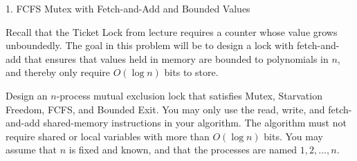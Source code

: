 \documentclass[12pt]{article}
\begin{document}


\begin{problem}{1. FCFS Mutex with Fetch-and-Add and Bounded Values}
        
    Recall that the Ticket Lock from lecture requires a counter whose value grows unboundedly. The goal in this problem will be to design a lock with fetch-and-add that ensures that values held in memory are bounded to polynomials in $n$, and thereby only require $O(\log n)$ bits to store.

    Design an $n$-process mutual exclusion lock that satisfies Mutex, Starvation Freedom, FCFS, and Bounded Exit. You may only use the read, write, and fetch-and-add shared-memory instructions in your algorithm. The algorithm must not require shared or local variables with more than $O(\log n)$ bits. You may assume that $n$ is fixed and known, and that the processes are named $1, 2, \ldots, n$.
\end{problem}
\end{document}
